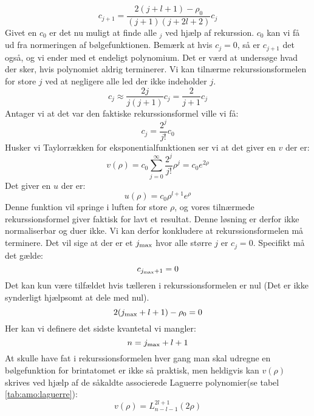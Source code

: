 \documentclass[../../Atom-ogMolekylefysik.tex]{subfiles}
\begin{document}
\begin{equation}
c_{j+1}=\frac{2(j+l+1)-\rho_0}{(j+1)(j+2l+2)}c_j
\end{equation}
Givet en $c_0$ er det nu muligt at finde alle $_j$ ved hjælp af rekurssion. $c_0$ kan vi få ud fra normeringen af bølgefunktionen. Bemærk at hvis $c_j=0$, så er $c_{j+1}$ det også, og vi ender med et endeligt polynomium. Det er værd at undersøge hvad der sker, hvis polynomiet aldrig terminerer. Vi kan tilnærme rekurssionsformelen for store $j$ ved at negligere alle led der ikke indeholder $j$.
$$
c_j\approx \frac{2j}{j(j+1)}c_j=\frac{2}{j+1}c_j
$$
Antager vi at det var den faktiske rekurssionsformel ville vi få:
$$
c_j=\frac{2^j}{j!}c_0
$$
Husker vi Taylorrækken for eksponentialfunktionen ser vi at det giver en $v$ der er:
$$
v(\rho) = c_0\sum_{j=0}^\infty \frac{2^j}{j!}\rho^j=c_0e^{2\rho}
$$
Det giver en $u$ der er:
$$
u(\rho)=c_0\rho^{l+1}e^{\rho}
$$
Denne funktion vil springe i luften for store $\rho$, og vores tilnærmede rekurssionsformel giver faktisk for lavt et resultat. Denne løsning er derfor ikke normaliserbar og duer ikke. Vi kan derfor konkludere at rekurssionsformelen må terminere. Det vil sige at der er et $j_{\text{max}}$ hvor alle større $j$ er $c_j=0$. Specifikt må det gælde:
\begin{equation}
    c_{j_{\text{max}}+1}=0
\end{equation}
Det kan kun være tilfældet hvis tælleren i rekurssionsformelen er nul (Det er ikke synderligt hjælpsomt at dele med nul). 
\begin{equation}
    2(j_{\text{max}}+l+1)-\rho_0=0
\end{equation}
Her kan vi definere det sidste kvantetal vi mangler:
\begin{equation}
    n=j_{\text{max}}+l+1
\end{equation}
At skulle have fat i rekurssionsformelen hver gang man skal udregne en bølgefunktion for brintatomet er ikke så praktisk, men heldigvis kan $v(\rho)$ skrives ved hjælp af de såkaldte associerede Laguerre polynomier(se tabel \ref{tab:amo:laguerre}):
\begin{equation}
    v(\rho)=L_{n-l-1}^{2l+1}(2\rho)
\end{equation}
\end{document}
